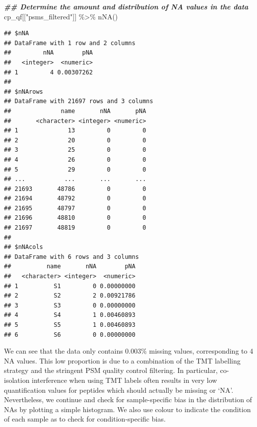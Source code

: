 \documentclass[9pt,a4paper,]{extarticle}
\newenvironment{Shaded}{\begin{snugshade}}{\end{snugshade}}
\newcommand{\DocumentationTok}[1]{\textcolor[rgb]{0.56,0.35,0.01}{\textbf{\textit{#1}}}}
\newcommand{\FunctionTok}[1]{\textcolor[rgb]{0.00,0.00,0.00}{#1}}
\newcommand{\NormalTok}[1]{#1}
\newcommand{\SpecialCharTok}[1]{\textcolor[rgb]{0.00,0.00,0.00}{#1}}
\newcommand{\StringTok}[1]{\textcolor[rgb]{0.31,0.60,0.02}{#1}}
\begin{document}
\begin{Shaded}
\begin{Highlighting}[]
\DocumentationTok{\#\# Determine the amount and distribution of NA values in the data}
\NormalTok{cp\_qf[[}\StringTok{"psms\_filtered"}\NormalTok{]] }\SpecialCharTok{\%\textgreater{}\%}
  \FunctionTok{nNA}\NormalTok{()}
\end{Highlighting}
\end{Shaded}

\begin{verbatim}
## $nNA
## DataFrame with 1 row and 2 columns
##         nNA        pNA
##   <integer>  <numeric>
## 1         4 0.00307262
## 
## $nNArows
## DataFrame with 21697 rows and 3 columns
##              name       nNA       pNA
##       <character> <integer> <numeric>
## 1              13         0         0
## 2              20         0         0
## 3              25         0         0
## 4              26         0         0
## 5              29         0         0
## ...           ...       ...       ...
## 21693       48786         0         0
## 21694       48792         0         0
## 21695       48797         0         0
## 21696       48810         0         0
## 21697       48819         0         0
## 
## $nNAcols
## DataFrame with 6 rows and 3 columns
##          name       nNA        pNA
##   <character> <integer>  <numeric>
## 1          S1         0 0.00000000
## 2          S2         2 0.00921786
## 3          S3         0 0.00000000
## 4          S4         1 0.00460893
## 5          S5         1 0.00460893
## 6          S6         0 0.00000000
\end{verbatim}

We can see that the data only contains 0.003\%
missing values, corresponding to 4 NA
values. This low proportion is due to a combination of the TMT labelling
strategy and the stringent PSM quality control filtering. In particular,
co-isolation interference when using TMT labels often results in very low
quantification values for peptides which should actually be missing or `NA'.
Nevertheless, we continue and check for sample-specific bias in the distribution
of NAs by plotting a simple histogram. We also use colour to indicate the
condition of each sample as to check for condition-specific bias.
\end{document}
